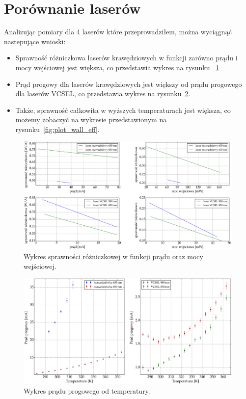 \section{Porównanie laserów}
Analizując pomiary dla 4 laserów które przeprowadziłem, można wyciągnąć nastepujące wnioski:
\begin{itemize}
\item Sprawność różniczkowa laserów krawędziowych w funkcji zarówno prądu i mocy wejściowej jest większa, co
przedstawia wykres na rysunku ~\ref{fig:plot_eff}
\item Prąd progowy dla laserów krawędziowych jest większy od prądu progowego dla laserów VCSEL, co przedstawia wykres
na rysunku~\ref{fig:plot_temp_i_th}.
\item Także, sprawność całkowita w wyższych temperaturach jest większa, co możemy zobaczyć na wykresie przedstawionym na
rysunku~\ref{fig:plot_wall_eff}.
\end{itemize}
\begin{figure}[H]
\center
  \includegraphics[scale=0.30]{plot_common/plot_eff.eps}
  \caption{Wykres sprawności różniczkowej w funkcji prądu oraz mocy wejściowej.}
  \label{fig:plot_eff}
\end{figure}
\begin{figure}
\center
  \includegraphics[scale=0.30]{plot_common/plot_temp_i_th.eps}
  \caption{Wykres prądu progowego od temperatury.}
  \label{fig:plot_temp_i_th}
\end{figure}
